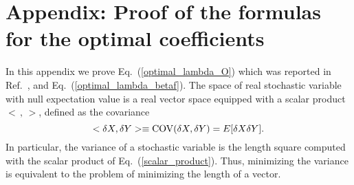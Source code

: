 \documentclass[pre,twocolumn]{revtex4-2}
\begin{document}
\section*{Appendix: Proof of the formulas for the optimal coefficients}
In this appendix we prove Eq.~(\ref{optimal_lambda_O}) which was reported in Ref.~\cite{PT-11}, and Eq.~(\ref{optimal_lambda_betaf}).
The space of real stochastic variable with null expectation value is a real vector space equipped with a scalar product $<\, , \, >$, defined as the covariance
\begin{equation}
  <\delta X, \delta Y> \equiv {\rm COV}(\delta X, \delta Y) = E[\delta X\delta Y].
  \label{scalar_product}
\end{equation}
In particular, the variance of a stochastic variable is the length square computed with the scalar product of Eq.~(\ref{scalar_product}).
Thus, minimizing the variance is equivalent to the problem of minimizing the length of a vector.
\end{document}
